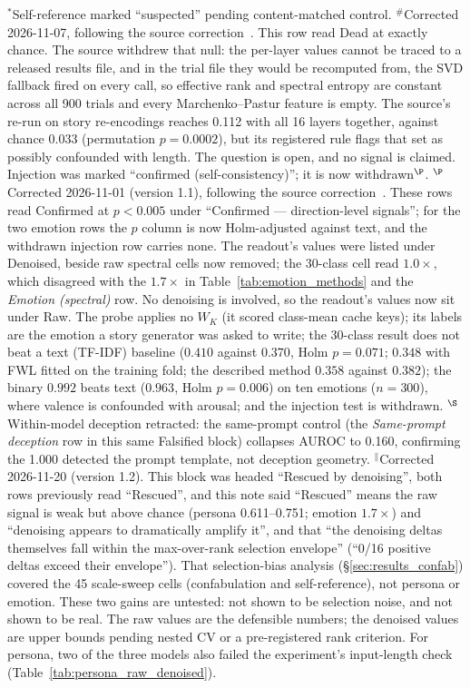 \documentclass[11pt,a4paper]{article}
\begin{document}
$^*$Self-reference marked ``suspected'' pending content-matched control.
$^{\#}$Corrected 2026-11-07, following the source correction~\citep{lyra_p4}. This row read Dead at exactly chance. The source withdrew that null: the per-layer values cannot be traced to a released results file, and in the trial file they would be recomputed from, the SVD fallback fired on every call, so effective rank and spectral entropy are constant across all 900 trials and every Marchenko--Pastur feature is empty. The source's re-run on story re-encodings reaches 0.112 with all 16 layers together, against chance 0.033 (permutation $p = 0.0002$), but its registered rule flags that set as possibly confounded with length. The question is open, and no signal is claimed.
Injection was marked ``confirmed (self-consistency)''; it is now withdrawn$^{\P}$.
$^{\P}$Corrected 2026-11-01 (version 1.1), following the source correction~\citep{lyra_p4}. These rows read Confirmed at $p < 0.005$ under ``Confirmed --- direction-level signals''; for the two emotion rows the $p$ column is now Holm-adjusted against text, and the withdrawn injection row carries none. The readout's values were listed under Denoised, beside raw spectral cells now removed; the 30-class cell read $1.0\times$, which disagreed with the $1.7\times$ in Table~\ref{tab:emotion_methods} and the \emph{Emotion (spectral)} row. No denoising is involved, so the readout's values now sit under Raw. The probe applies no $W_K$ (it scored class-mean cache keys); its labels are the emotion a story generator was asked to write; the 30-class result does not beat a text (TF-IDF) baseline ($0.410$ against $0.370$, Holm $p = 0.071$; $0.348$ with FWL fitted on the training fold; the described method $0.358$ against $0.382$); the binary $0.992$ beats text ($0.963$, Holm $p = 0.006$) on ten emotions ($n = 300$), where valence is confounded with arousal; and the injection test is withdrawn.
$^\S$Within-model deception retracted: the same-prompt control (the \emph{Same-prompt deception} row in this same Falsified block) collapses AUROC to 0.160, confirming the 1.000 detected the prompt template, not deception geometry.
$^\|$Corrected 2026-11-20 (version 1.2). This block was headed ``Rescued by denoising'', both rows previously read ``Rescued'', and this note said ``Rescued'' means the raw signal is weak but above chance (persona 0.611--0.751; emotion $1.7\times$) and ``denoising appears to dramatically amplify it'', and that ``the denoising deltas themselves fall within the max-over-rank selection envelope'' (``0/16 positive deltas exceed their envelope''). That selection-bias analysis (\S\ref{sec:results_confab}) covered the 45 scale-sweep cells (confabulation and self-reference), not persona or emotion. These two gains are untested: not shown to be selection noise, and not shown to be real. The raw values are the defensible numbers; the denoised values are upper bounds pending nested CV or a pre-registered rank criterion. For persona, two of the three models also failed the experiment's input-length check (Table~\ref{tab:persona_raw_denoised}).
\end{document}
